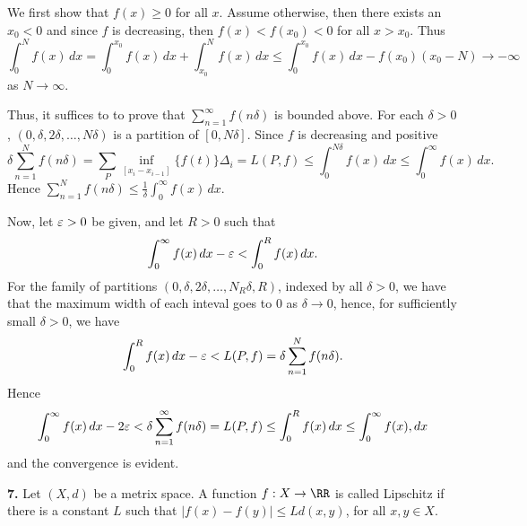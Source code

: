 \documentclass{homework}
\begin{document}
\begin{solution}
  We first show that $f(x) \ge 0$ for all $x$. Assume otherwise, then there exists an $x_0<0$ and since $f$ is decreasing, then $f(x) < f(x_0) < 0$ for all $x>x_0$.  Thus
  $$
    \int_0^N f(x)\,dx = \int_0^{x_0} f(x)\,dx + \int_{x_0}^N f(x)\,dx \le \int_0^{x_0} f(x)\,dx - f(x_0)(x_0-N) \to -\infty
  $$
  as $N\to\infty$.

  Thus, it suffices to to prove that $\sum_{n=1}^\infty f(n\delta)$ is bounded above.  For each $\delta>0$, $(0,\delta,2\delta,\dots,N\delta)$ is a partition of $[0,N\delta]$. Since $f$ is decreasing and positive
  $$
    \delta \sum_{n=1}^N f(n\delta) = \sum_P \inf_{[x_i-x_{i-1}]}\{f(t)\}\Delta_i = L(P,f) \le \int_0^{N\delta} f(x)\,dx \le \int_0^\infty f(x)\,dx.
  $$ 
  Hence $\sum_{n=1}^N f(n\delta) \le \frac 1\delta \int_0^\infty f(x)\,dx$.

  Now, let $\varepsilon >0$ be given, and let $R>0$ such that
  $$
    \int_0^\infty f(x)\,dx - \varepsilon < \int_0^R f(x)\,dx.
  $$
  For the family of partitions $(0,\delta,2\delta,\dots,N_R\delta,R)$, indexed by all $\delta >0$, we have that the maximum width of each inteval goes to 0 as $\delta \to 0$, hence, for sufficiently small $\delta>0$, we have
  $$
    \int_0^R f(x)\,dx - \varepsilon < L(P,f) = \delta \sum_{n=1}^N f(n\delta). 
  $$
  Hence 
  $$
    \int_0^\infty f(x)\,dx - 2\varepsilon <\delta\sum_{n=1}^\infty f(n\delta) = L(P,f) \le \int_0^Rf(x)\,dx \le \int_0^\infty f(x),dx
  $$
  and the convergence is evident.
\end{solution}

{\bf 7.} Let $(X,d)$ be a metrix space. A function $f:X\to \RR$ is called Lipschitz if there is a constant $L$ such that $|f(x) - f(y)| \le Ld(x,y)$, for all $x,y\in X$.
\end{document}
